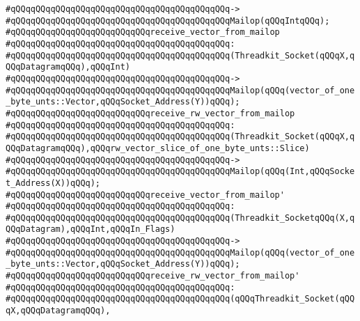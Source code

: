 \verb|#qQQqqQQqqQQqqQQqqQQqqQQqqQQqqQQqqQQqqQQqqQQq->|\newline
\verb|#qQQqqQQqqQQqqQQqqQQqqQQqqQQqqQQqqQQqqQQqqQQqMailop(qQQqIntqQQq);|\newline
\newline
\verb|#qQQqqQQqqQQqqQQqqQQqqQQqqQQqreceive_vector_from_mailop|\newline
\verb|#qQQqqQQqqQQqqQQqqQQqqQQqqQQqqQQqqQQqqQQqqQQq:|\newline
\verb|#qQQqqQQqqQQqqQQqqQQqqQQqqQQqqQQqqQQqqQQqqQQq(Threadkit_Socket(qQQqX,qQQqDatagramqQQq),qQQqInt)|\newline
\verb|#qQQqqQQqqQQqqQQqqQQqqQQqqQQqqQQqqQQqqQQqqQQq->|\newline
\verb|#qQQqqQQqqQQqqQQqqQQqqQQqqQQqqQQqqQQqqQQqqQQqMailop(qQQq(vector_of_one_byte_unts::Vector,qQQqSocket_Address(Y))qQQq);|\newline
\newline
\verb|#qQQqqQQqqQQqqQQqqQQqqQQqqQQqreceive_rw_vector_from_mailop|\newline
\verb|#qQQqqQQqqQQqqQQqqQQqqQQqqQQqqQQqqQQqqQQqqQQq:|\newline
\verb|#qQQqqQQqqQQqqQQqqQQqqQQqqQQqqQQqqQQqqQQqqQQq(Threadkit_Socket(qQQqX,qQQqDatagramqQQq),qQQqrw_vector_slice_of_one_byte_unts::Slice)|\newline
\verb|#qQQqqQQqqQQqqQQqqQQqqQQqqQQqqQQqqQQqqQQqqQQq->|\newline
\verb|#qQQqqQQqqQQqqQQqqQQqqQQqqQQqqQQqqQQqqQQqqQQqMailop(qQQq(Int,qQQqSocket_Address(X))qQQq);|\newline
\newline
\verb|#qQQqqQQqqQQqqQQqqQQqqQQqqQQqreceive_vector_from_mailop'|\newline
\verb|#qQQqqQQqqQQqqQQqqQQqqQQqqQQqqQQqqQQqqQQqqQQq:|\newline
\verb|#qQQqqQQqqQQqqQQqqQQqqQQqqQQqqQQqqQQqqQQqqQQq(Threadkit_SocketqQQq(X,qQQqDatagram),qQQqInt,qQQqIn_Flags)|\newline
\verb|#qQQqqQQqqQQqqQQqqQQqqQQqqQQqqQQqqQQqqQQqqQQq->|\newline
\verb|#qQQqqQQqqQQqqQQqqQQqqQQqqQQqqQQqqQQqqQQqqQQqMailop(qQQq(vector_of_one_byte_unts::Vector,qQQqSocket_Address(Y))qQQq);|\newline
\newline
\verb|#qQQqqQQqqQQqqQQqqQQqqQQqqQQqreceive_rw_vector_from_mailop'|\newline
\verb|#qQQqqQQqqQQqqQQqqQQqqQQqqQQqqQQqqQQqqQQqqQQq:|\newline
\verb|#qQQqqQQqqQQqqQQqqQQqqQQqqQQqqQQqqQQqqQQqqQQq(qQQqThreadkit_Socket(qQQqX,qQQqDatagramqQQq),|\newline
